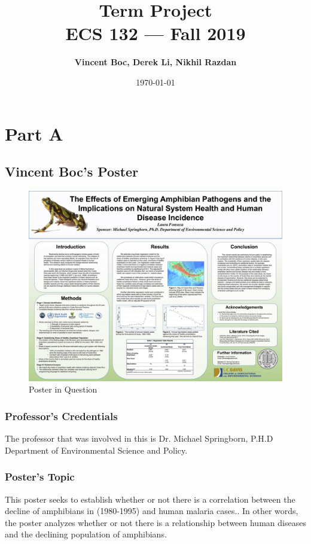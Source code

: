 \documentclass[12pt]{article}
\title{\bf Term Project\\[2ex] 
       \rm\normalsize ECS 132 --- Fall 2019}
\date{\today}
\author{\bf Vincent Boc, Derek Li, Nikhil Razdan}
\begin{document}
\maketitle



\tableofcontents
\newpage

\section{Part A}

\subsection{Vincent Boc's Poster}
\begin{figure}
	\centering
  	\includegraphics[width=150mm]{poster0.jpg}
 	\caption{Poster in Question}
 	\label{fig:vincent_poster}
\end{figure}

\subsubsection{Professor's Credentials}
The professor that was involved in this is Dr. Michael Springborn, P.H.D Department of Environmental Science and Policy.

\subsubsection*{Poster's Topic}
This poster seeks to establish whether or not there is a correlation between the decline of amphibians in (1980-1995) and human malaria cases.. In other words, the poster analyzes whether or not there is a relationship between human diseases and the declining population of amphibians. 
\end{document}
